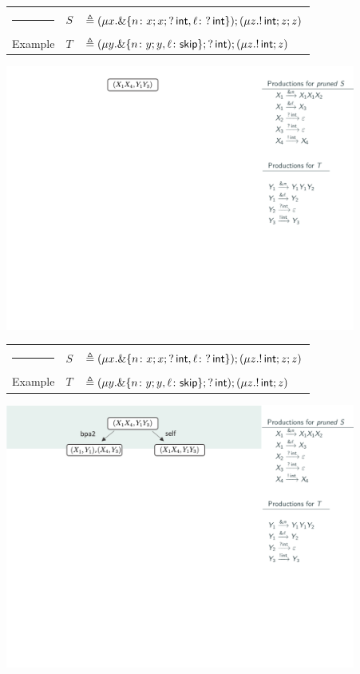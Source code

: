 \documentclass[10pt]{beamer}
\begin{document}
\begin{frame}
	\begin{tabular} {l l l }
		{\color{teal}\rule{3cm}{2pt}} &  $S$ &$\triangleq (\mu x. \&\{n\colon x;x;?\,\mathsf{int},
     	 \ell\colon ?\,\mathsf{int} \});( \mu z. !\,\mathsf{int}; z;z )$\\
 		{\color{teal} Example}  &  $T$ &$\triangleq (\mu y. \&\{n\colon y;y,
     	 \ell\colon \mathsf{skip} \}; ?\,\mathsf{int}); (\mu z. !\,\mathsf{int}; z)$
	\end{tabular}
	\vspace*{2mm}
	\includegraphics[width=11.5cm]{img/exemplo-9}\smallskip
\end{frame}

\begin{frame}
	\begin{tabular} {l l l }
  		{\color{teal}\rule{3cm}{2pt}} &  $S$ &$\triangleq (\mu x. \&\{n\colon x;x;?\,\mathsf{int},
      	\ell\colon ?\,\mathsf{int} \});( \mu z. !\,\mathsf{int}; z;z )$\\
  	{\color{teal} Example}  &  $T$ &$\triangleq (\mu y. \&\{n\colon y;y,
      \ell\colon \mathsf{skip} \}; ?\,\mathsf{int}); (\mu z. !\,\mathsf{int}; z)$
	\end{tabular}
	\vspace*{2mm}
	\includegraphics[width=11.5cm]{img/exemplo-8}\smallskip
\end{frame}
\end{document}
